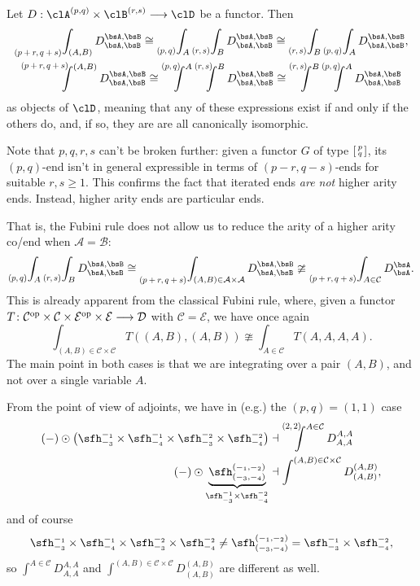 \documentclass[11pt]{amsart}
\begin{document}
\begin{theorem}\label{fubini-for-p-q-co-ends}
	Let $D :\clA^{(p,q)}\times\clB^{(r,s)}\longrightarrow\clD$ be a functor. Then
    \begin{gather}
		\pqEnd{p+r}{q+s}{(A,B)}D^{\bsA,\bsB}_{\bsA,\bsB}
		\cong
		\pqEnd{p}{q}{A}\pqEnd{r}{s}{B}D^{\bsA,\bsB}_{\bsA,\bsB}
		\cong
        \pqEnd{r}{s}{B}\pqEnd{p}{q}{A}D^{\bsA,\bsB}_{\bsA,\bsB},\label{fubini-expressions}\\
		\pqCoend{p+r}{q+s}{(A,B)}D^{\bsA,\bsB}_{\bsA,\bsB}
		\cong
		\pqCoend{p}{q}{A}\pqCoend{r}{s}{B}D^{\bsA,\bsB}_{\bsA,\bsB}
		\cong
		\pqCoend{r}{s}{B}\pqCoend{p}{q}{A}D^{\bsA,\bsB}_{\bsA,\bsB}
    \end{gather}
	as objects of $\clD$, meaning that any of these expressions exist if and only if the others do, and, if so, they are are all canonically isomorphic.%
\end{theorem}
\begin{remark}%
	Note that $p,q,r,s$ can't be broken further: given a functor $G$ of type $\typepq{p}{q}$, its $(p,q)$-end isn't in general expressible in terms of $(p-r,q-s)$-ends for suitable $r,s\ge 1$. This confirms the fact that iterated ends \emph{are not} higher arity ends. Instead, higher arity ends are particular ends. 

    That is, the Fubini rule does not allow us to reduce the arity of a higher arity co/end when $\mathcal{A}=\mathcal{B}$:
	\[
        \pqEnd{p}{q}{A}\pqEnd{r}{s}{B}D^{\bsA,\bsB}_{\bsA,\bsB}
        \cong
		\pqEnd{p+r}{q+s}{(A,B)\in\mathcal{A}\times\mathcal{A}}D^{\bsA,\bsB}_{\bsA,\bsB}
		\ncong
		\pqEnd{p+r}{q+s}{A\in\mathcal{C}}D^{\bsA}_{\bsA}.
	\]
    This is already apparent from the classical Fubini rule, where, given a functor $T\colon\mathcal{C}^{\mathrm{op}}\times\mathcal{C}\times\mathcal{E}^{\mathrm{op}}\times\mathcal{E}\longrightarrow\mathcal{D}$ with $\mathcal{C}=\mathcal{E}$, we have once again
	\[
		\int_{(A,B)\in\mathcal{C}\times\mathcal{C}}T((A,B),(A,B))
		\ncong
		\int_{A\in\mathcal{C}}T(A,A,A,A).
	\]
    The main point in both cases is that we are integrating over a pair $(A,B)$, and not over a single variable $A$.

    From the point of view of adjoints, we have in (e.g.) the $(p,q)=(1,1)$ case
    \begin{align*}
        (-)\odot\left(\ph^{-_{1}}_{-_{3}}\times\ph^{-_{1}}_{-_{4}}\times\ph^{-_{2}}_{-_{3}}\times\ph^{-_{2}}_{-_{4}}\right) &\dashv \pqCoend{2}{2}{A\in\mathcal{C}}D^{A,A}_{A,A}\\
        (-)\odot\underbrace{\ph^{(-_{1},-_{2})}_{(-_{3},-_{4})}}_{\ph^{-_{1}}_{-_{3}}\times\ph^{-_{2}}_{-_{4}}}             &\dashv \int^{(A,B)\in\mathcal{C}\times\mathcal{C}}D^{(A,B)}_{(A,B)},
    \end{align*}
    and of course
    \[
        \ph^{-_{1}}_{-_{3}}\times\ph^{-_{1}}_{-_{4}}\times\ph^{-_{2}}_{-_{3}}\times\ph^{-_{2}}_{-_{4}}
        \neq
        \ph^{(-_{1},-_{2})}_{(-_{3},-_{4})}
        =
        \ph^{-_{1}}_{-_{3}}\times\ph^{-_{2}}_{-_{4}},
    \]
    so $\int^{A\in\mathcal{C}}D^{A,A}_{A,A}$ and $\int^{(A,B)\in\mathcal{C}\times\mathcal{C}}D^{(A,B)}_{(A,B)}$ are different as well.
\end{remark}
\end{document}
